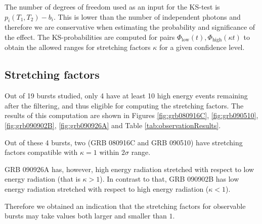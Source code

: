 \documentclass{article}
\begin{document}
The number of degrees of freedom used as an input for the KS-test is
$p_i\left(T_1, T_2\right) - b_i$. This is lower than the number of
independent photons and therefore we are conservative when estimating
the probability and significance of the effect. The KS-probabilities
are computed for pairs $\Phi_\text{low}\left(t\right),
\Phi_\text{high}\left(\kappa t\right)$ to obtain the allowed ranges
for stretching factors $\kappa$ for a given confidence level.

\subsection{Stretching factors}

Out of 19 bursts studied, only 4 have at least 10 high energy events
remaining after the filtering, and thus eligible for computing the
stretching factors. The results of this computation are shown in
Figures \ref{fig:grb080916C}, \ref{fig:grb090510},
\ref{fig:grb090902B}, \ref{fig:grb090926A} and Table
\ref{tab:observationResults}.

Out of these 4 bursts, two (GRB 080916C and GRB 090510) have
stretching factors compatible with $\kappa = 1$ within $2\sigma$
range.

GRB 090926A has, however, high energy radiation stretched with respect
to low energy radiation (that is $\kappa > 1$). In contrast to that,
GRB 090902B has low energy radiation stretched with respect to high
energy radiation ($\kappa < 1$).

Therefore we obtained an indication that the stretching factors for
observable bursts may take values both larger and smaller than $1$.
\end{document}
